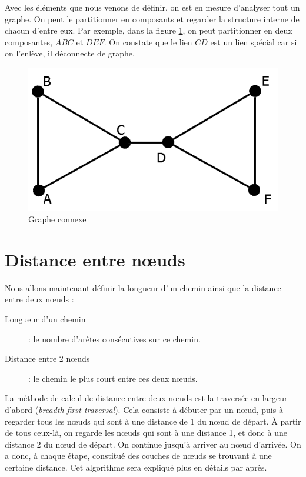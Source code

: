 Avec les éléments que nous venons de définir, on est en mesure d'analyser tout un graphe. On peut le partitionner en composants et regarder la structure interne de chacun d'entre eux. Par exemple, dans la figure \ref{gr_connexe}, on peut partitionner en deux composantes, $ABC$ et $DEF$. On constate que le lien $CD$ est un lien spécial car si on l'enlève, il déconnecte de graphe.\\
	\begin{figure}
	\center
	\includegraphics[scale=0.3]{images/18_gr_connexe.png}
	\caption{\label{gr_connexe} Graphe connexe}
	\end{figure}

\section{Distance entre n\oe uds}
Nous allons maintenant définir la longueur d'un chemin ainsi que la distance entre deux n\oe uds :
\begin{description}
\item[Longueur d'un chemin] : le nombre d'arêtes consécutives sur ce chemin.
\item [Distance entre 2 n\oe uds] : le chemin le plus court entre ces deux n\oe uds.
\end{description}

La méthode de calcul de distance entre deux n\oe uds est la traversée en largeur d'abord (\emph{breadth-first traversal}). Cela consiste à débuter par un n\oe ud, puis à regarder tous les n\oe uds qui sont à une distance de 1 du n\oe ud de départ. À partir de tous ceux-là, on regarde les n\oe uds qui sont à une distance 1, et donc à une distance 2 du n\oe ud de départ. On continue jusqu'à arriver au n\oe ud d'arrivée. On a donc, à chaque étape, constitué des couches de n\oe uds se trouvant à une certaine distance. Cet algorithme sera expliqué plus en détails par après.\\

